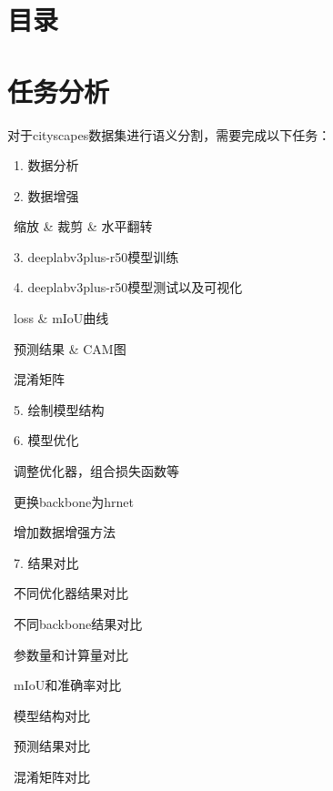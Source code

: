 \documentclass[12pt]{ctexart}
\newcommand{\cmark}{\ding{51}}
\newcommand{\checkbox}{\ding{111}}
\newcommand{\doneitem}[1]{\item[\cmark]\ #1}
\newcommand{\todoitem}[1]{\item[\checkbox]\ #1}
\begin{document}
\makeFancyCover
\newpage
\section{目录}
\tableofcontents
\newpage

\section{任务分析}
对于cityscapes数据集进行语义分割，需要完成以下任务： 

\begin{todolist}
  \doneitem{1. 数据分析}
  \doneitem{2. 数据增强}
    \begin{todolist}
      \doneitem{缩放 \& 裁剪 \& 水平翻转}
    \end{todolist}
  \doneitem{3. deeplabv3plus-r50模型训练}
  \doneitem{4. deeplabv3plus-r50模型测试以及可视化}
  \begin{todolist}
    \doneitem{loss \& mIoU曲线}
    \doneitem{预测结果 \& CAM图}
    \doneitem{混淆矩阵}
  \end{todolist}
  \doneitem{5. 绘制模型结构}
\end{todolist}
\begin{todolist}
  \doneitem{6. 模型优化}
    \begin{todolist}
      \doneitem{调整优化器，组合损失函数等}
      \doneitem{更换backbone为hrnet}
      \todoitem{增加数据增强方法}
    \end{todolist}
\end{todolist}
\begin{todolist}
  \doneitem{7. 结果对比}
    \begin{todolist}
      \doneitem{不同优化器结果对比}
      \doneitem{不同backbone结果对比}
        \begin{todolist}
          \doneitem{参数量和计算量对比}
          \doneitem{mIoU和准确率对比}
          \doneitem{模型结构对比}
          \doneitem{预测结果对比}
          \doneitem{混淆矩阵对比}
        \end{todolist}
    \end{todolist}
\end{todolist}
\end{document}
